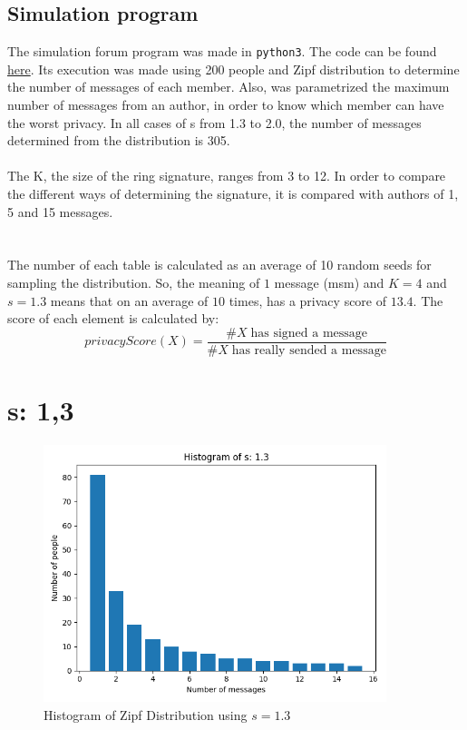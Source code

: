 \documentclass{article}
\begin{document}
\subsection{Simulation program}
The simulation forum program was made in \texttt{python3}. The code can be found \href{https://github.com/sergisi/glowing-dollop}{here}. Its execution was made using 200 people and Zipf distribution to determine the number of messages of each member. Also, was parametrized the maximum number of messages from an author, in order to know which member can have the worst privacy. In all cases of s from 1.3 to 2.0, the number of messages determined from the distribution is 305.
\\
\\
The K, the size of the ring signature, ranges from 3 to 12. In order to compare the different ways of determining the signature, it is compared with authors of 1, 5 and 15 messages.\\
\\
\\
The number of each table is calculated as an average of 10 random seeds for sampling 
the distribution. So, the meaning of $1$ message (msm) and $K=4$ and $s = 1.3$ means 
that on an average of $10$ times,  has a privacy score of $13.4$. The score of each element
is calculated by:
\[
			privacyScore(X) = 
			\frac
			{\# X\;\textrm{has signed a message}}
			{\# X\;\textrm{has really sended a message}}
\]

\section{s: 1,3}
\begin{figure}[H] 
	\centering
	\includegraphics[width=10cm]{imgs/histogram-13.png}
	\caption{Histogram of Zipf Distribution using $s=1.3$}
	\label{fig:hist-13}
  \end{figure}


\end{document}
